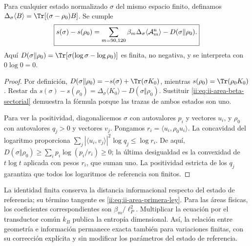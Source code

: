 \begin{theorem}
\label{ii:thm:ii-area-ley-finita}
Para cualquier estado normalizado \(\sigma\) del mismo espacio finito,
definamos \(\Delta_\sigma\langle B\rangle
=\Tr[(\sigma-\rho_0)B]\). Se cumple
\begin{equation}
 \boxed{
 s(\sigma)-s(\rho_0)
 =\sum_{m=90,120}\beta_m
      \Delta_\sigma\langle\mathcal A_m^{\rm n}\rangle
   -D(\sigma\Vert\rho_0).}
 \label{ii:eq:ii-area-ley-finita}
\end{equation}
Aquí \(D(\sigma\Vert\rho_0)=\Tr[\sigma(\log\sigma-\log\rho_0)]\)
es finita, no negativa, y se interpreta con \(0\log0=0\).
\end{theorem}
\begin{proof}
Por definición,
\(D(\sigma\Vert\rho_0)=-s(\sigma)+\Tr(\sigma K_0)\), mientras
\(s(\rho_0)=\Tr(\rho_0K_0)\). Restar da
\(s(\sigma)-s(\rho_0)=\Delta_\sigma\langle K_0\rangle
-D(\sigma\Vert\rho_0)\). Sustituir
\eqref{ii:eq:ii-area-beta-sectorial} demuestra la fórmula porque las
trazas de ambos estados son uno.

Para ver la positividad, diagonalicemos \(\sigma\) con autovalores
\(p_i\) y vectores \(u_i\), y \(\rho_0\) con autovalores
\(q_j>0\) y vectores \(v_j\). Pongamos
\(r_i=\langle u_i,\rho_0u_i\rangle\). La concavidad del logaritmo
proporciona
\(\sum_j|\langle u_i,v_j\rangle|^2\log q_j\le\log r_i\).
De aquí,
\(D(\sigma\Vert\rho_0)\ge\sum_i p_i\log(p_i/r_i)\ge0\);
la última desigualdad es la convexidad de \(t\log t\) aplicada
con pesos \(r_i\), que suman uno. La positividad estricta de los
\(q_j\) garantiza que todos los logaritmos de referencia son finitos.
\end{proof}

La identidad finita conserva la distancia informacional respecto del
estado de referencia; su término tangente es
\eqref{ii:eq:ii-area-primera-ley}. Para las áreas físicas, los
coeficientes correspondientes son \(\beta_m/\ell_P^2\).
Multiplicar la ecuación por el transductor común \(k_B\) publica
la entropía dimensional. Así, la relación entre geometría e información
permanece exacta también para variaciones finitas, con su corrección
explícita y sin modificar los parámetros del estado de referencia.
